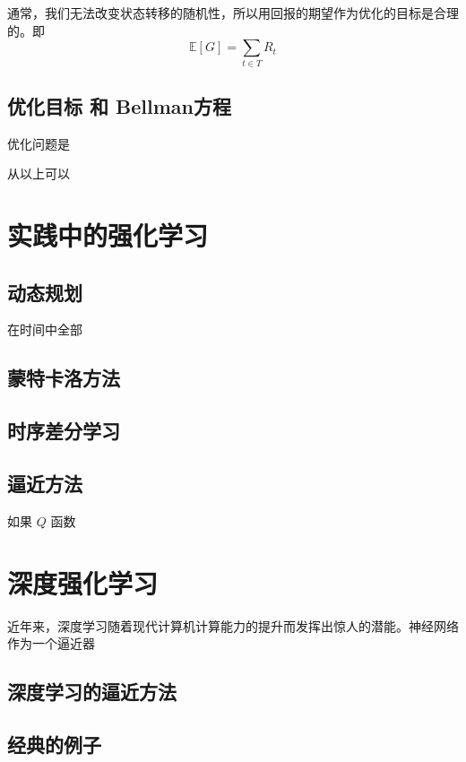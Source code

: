 通常，我们无法改变状态转移的随机性，所以用回报的期望作为优化的目标是合理的。即
\begin{equation}
    \mathbb{E} [G] = \sum_{t \in T} R_t
\end{equation}

\subsection{优化目标 和 Bellman方程}
优化问题是


从以上可以



\section{实践中的强化学习}
\subsection{动态规划}
在时间中全部

\subsection{蒙特卡洛方法}


\subsection{时序差分学习}

\subsection{逼近方法}
    如果 $Q$ 函数

\section{深度强化学习}
    近年来，深度学习随着现代计算机计算能力的提升而发挥出惊人的潜能。神经网络作为一个逼近器

\subsection{深度学习的逼近方法}

\subsection{经典的例子}


